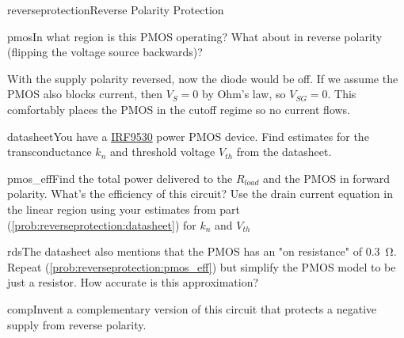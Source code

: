 \begin{mainquestion}{reverseprotection}{Reverse Polarity Protection}
\begin{partquestion}{pmos}{In what region is this PMOS operating? What about in reverse polarity (flipping the voltage source backwards)?}
\begin{answer}
    With the supply polarity reversed, now the diode would be off. If we assume the PMOS also blocks current, then $V_{S} = 0$ by Ohm's law, so $V_{SG} = 0$. This comfortably places the PMOS in the cutoff regime so no current flows.
\end{answer}
\end{partquestion}

\begin{partquestion}{datasheet}{You have a \href{https://www.vishay.com/docs/91076/91076.pdf}{IRF9530} power PMOS device. Find estimates for the transconductance $k_n$ and threshold voltage $V_{th}$ from the datasheet.}
\end{partquestion}

\begin{partquestion}{pmos_eff}{Find the total power delivered to the $R_{load}$ and the PMOS in forward polarity. What's the efficiency of this circuit? Use the drain current equation in the linear region using your estimates from part (\cref{prob:reverseprotection:datasheet}) for $k_n$ and $V_{th}$}
\end{partquestion}

\begin{partquestion}{rds}{The datasheet also mentions that the PMOS has an "on resistance" of \qty{0.3}{\ohm}. Repeat (\cref{prob:reverseprotection:pmos_eff}) but simplify the PMOS model to be just a resistor. How accurate is this approximation?}
\end{partquestion}

\begin{partquestion}{comp}{Invent a complementary version of this circuit that protects a negative supply from reverse polarity.}
\end{partquestion}

\end{mainquestion}
